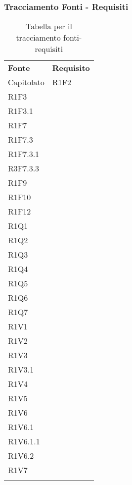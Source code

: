 \subsubsection{Tracciamento Fonti - Requisiti}

\renewcommand{\arraystretch}{2.2}

\begin{longtable}{|C{6.5cm}|C{6.5cm}|}

	\caption{Tabella per il tracciamento fonti-requisiti}\\
	\hline

	\textbf{Fonte} & \textbf{Requisito}
	\tabularnewline
	\endfirsthead

	Capitolato &
	\centering
	R1F2\\
	R1F3 \\
	R1F3.1\\
	R1F7\\
	R1F7.3\\
	R1F7.3.1\\
	R3F7.3.3\\
	R1F9\\
	R1F10\\
	R1F12\\
	R1Q1\\
	R1Q2\\
	R1Q3\\
	R1Q4\\
	R1Q5\\
	R1Q6\\
	R1Q7\\
	R1V1\\
	R1V2\\
	R1V3\\
	R1V3.1\\
	R1V4\\
	R1V5\\
	R1V6\\
	R1V6.1\\
	R1V6.1.1\\
	R1V6.2\\
	R1V7\\

	\tabularnewline


\end{longtable}
